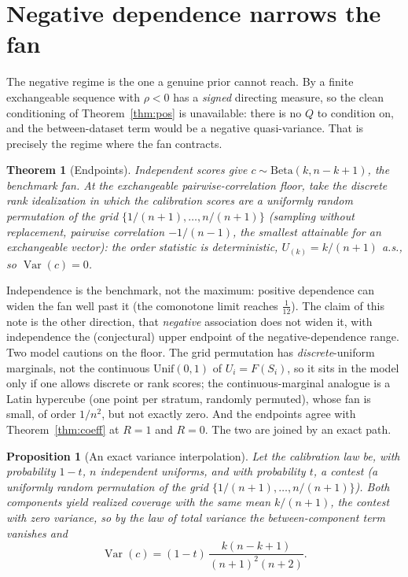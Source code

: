 \documentclass[11pt]{article}
\newtheorem{theorem}{Theorem}
\newtheorem{proposition}{Proposition}
\begin{document}
\section{Negative dependence narrows the fan}

The negative regime is the one a genuine prior cannot reach. By \citet{kerns2006} a finite
exchangeable sequence with $\rho<0$ has a \emph{signed} directing measure, so the clean conditioning
of Theorem~\ref{thm:pos} is unavailable: there is no $Q$ to condition on, and the between-dataset
term would be a negative quasi-variance. That is precisely the regime where the fan contracts.

\begin{theorem}[Endpoints]\label{thm:ends}
Independent scores give $c\sim\mathrm{Beta}(k,n-k+1)$, the benchmark fan. At the exchangeable
pairwise-correlation floor, take the discrete rank idealization in which the calibration scores are a
uniformly random permutation of the grid $\{1/(n+1),\dots,n/(n+1)\}$ (sampling without replacement,
pairwise correlation $-1/(n-1)$, the smallest attainable for an exchangeable vector): the order
statistic is deterministic, $U_{(k)}=k/(n+1)$ a.s., so $\operatorname{Var}(c)=0$.
\end{theorem}

Independence is the benchmark, not the maximum: positive dependence can widen the fan well past it
(the comonotone limit reaches $\tfrac1{12}$). The claim of this note is the other direction, that
\emph{negative} association does not widen it, with independence the (conjectural) upper endpoint of
the negative-dependence range. Two model cautions on the floor. The grid permutation has
\emph{discrete}-uniform marginals, not the continuous $\mathrm{Unif}(0,1)$ of $U_i=F(S_i)$, so it sits
in the model only if one allows discrete or rank scores; the continuous-marginal analogue is a Latin
hypercube (one point per stratum, randomly permuted), whose fan is small, of order $1/n^2$, but not
exactly zero. And the endpoints agree with Theorem~\ref{thm:coeff} at $R=1$ and $R=0$. The two are
joined by an exact path.

\begin{proposition}[An exact variance interpolation]\label{prop:path}
Let the calibration law be, with probability $1-t$, $n$ independent uniforms, and with probability
$t$, a contest (a uniformly random permutation of the grid $\{1/(n+1),\dots,n/(n+1)\}$). Both
components yield realized coverage with the same mean $k/(n+1)$, the contest with zero variance, so by
the law of total variance the between-component term vanishes and
\begin{equation}
\operatorname{Var}(c)=(1-t)\,\frac{k(n-k+1)}{(n+1)^2(n+2)} .
\end{equation}
\end{proposition}
\end{document}
